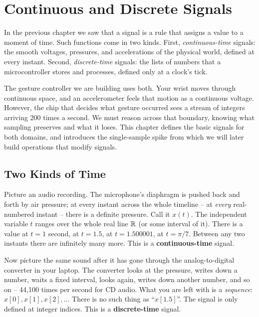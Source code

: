 \chapter{Continuous and Discrete Signals}

In the previous chapter we saw that a signal is a rule that assigns a
value to a moment of time. Such functions come in two kinds.
First, \emph{continuous-time} signals: the smooth
voltages, pressures, and accelerations of the physical world, defined at every
instant. Second, \emph{discrete-time} signals: the lists of numbers that a
microcontroller stores and processes, defined only at a clock's tick.

The gesture controller we are building uses both. Your
wrist moves through continuous space, and an accelerometer feels that motion as
a continuous voltage. However, the chip that decides what gesture occurred sees a stream of integers arriving 200 times a second. We must reason across that boundary, knowing what sampling preserves and what it loses. This chapter defines the basic signals for both domains, and introduces the single-sample spike from which we will later build operations that modify signals.

\chapterline

\section{Two Kinds of Time}
\label{ch02:two-kinds}

Picture an audio recording. The microphone's diaphragm is pushed back and forth
by air pressure; at every instant across the whole timeline -- at
\emph{every} real-numbered instant -- there is a definite pressure. Call it
$x(t)$. The independent variable $t$ ranges over the whole real line $\mathbb{R}$ (or some
interval of it). There is a value at $t = 1$ second, at $t = 1.5$, at
$t = 1.500001$, at $t = \pi/7$. Between any two instants there are infinitely many
more. This is a \textbf{continuous-time} signal.

Now picture the same sound after it has gone through the analog-to-digital
converter in your laptop. The converter looks at the pressure, writes down a
number, waits a fixed interval, looks again, writes down another number, and so
on -- 44{,}100 times per second for CD audio. What you are left with is a
\emph{sequence}: $x[0], x[1], x[2], \dots$ There is no such thing as
``$x[1.5]$''. The signal is only defined at integer indices. This is a
\textbf{discrete-time} signal.

